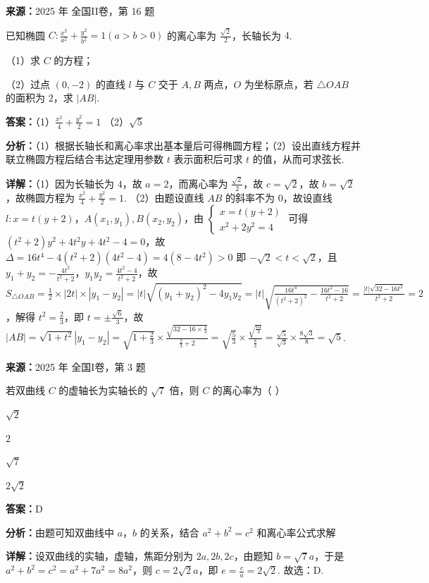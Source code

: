 \begin{question}[points=15]
\textbf{来源：}2025 年 全国II卷，第 16 题\par
已知椭圆 $C:\frac{x^2}{a^2}+\frac{y^2}{b^2}=1(a>b>0)$ 的离心率为 $\frac{\sqrt{2}}{2}$，长轴长为 $4$.

（1）求 $C$ 的方程；

（2）过点 $(0,-2)$ 的直线 $l$ 与 $C$ 交于 $A,B$ 两点，$O$ 为坐标原点，若 $\triangle OAB$ 的面积为 $2$，求 $|AB|$.
\begin{solution}
\textbf{答案：}（1）$\frac{x^2}{4}+\frac{y^2}{2}=1$
（2）$\sqrt{5}$

\textbf{分析：}（1）根据长轴长和离心率求出基本量后可得椭圆方程；（2）设出直线方程并联立椭圆方程后结合韦达定理用参数 $t$ 表示面积后可求 $t$ 的值，从而可求弦长.

\textbf{详解：}（1）因为长轴长为 $4$，故 $a=2$，而离心率为 $\frac{\sqrt{2}}{2}$，故 $c=\sqrt{2}$，故 $b=\sqrt{2}$，故椭圆方程为 $\frac{x^2}{4}+\frac{y^2}{2}=1$.
（2）由题设直线 $AB$ 的斜率不为 $0$，故设直线 $l:x=t(y+2)$，$A(x_1,y_1),B(x_2,y_2)$，由 $\begin{cases}x=t(y+2)\\x^2+2y^2=4\end{cases}$ 可得 $(t^2+2)y^2+4t^2y+4t^2-4=0$，故 $\Delta=16t^4-4(t^2+2)(4t^2-4)=4(8-4t^2)>0$ 即 $-\sqrt{2}<t<\sqrt{2}$，且 $y_1+y_2=-\frac{4t^2}{t^2+2}$，$y_1y_2=\frac{4t^2-4}{t^2+2}$，故 $S_{\triangle OAB}=\frac{1}{2}\times|2t|\times|y_1-y_2|=|t|\sqrt{(y_1+y_2)^2-4y_1y_2}=|t|\sqrt{\frac{16t^4}{(t^2+2)^2}-\frac{16t^2-16}{t^2+2}}=\frac{|t|\sqrt{32-16t^2}}{t^2+2}=2$，解得 $t^2=\frac{2}{3}$，即 $t=\pm\frac{\sqrt{6}}{3}$，故 $|AB|=\sqrt{1+t^2}|y_1-y_2|=\sqrt{1+\frac{2}{3}}\times\frac{\sqrt{32-16\times\frac{2}{3}}}{\frac{2}{3}+2}=\sqrt{\frac{5}{3}}\times\frac{\sqrt{\frac{64}{3}}}{\frac{8}{3}}=\frac{\sqrt{5}}{\sqrt{3}}\times\frac{8\sqrt{3}}{8}=\sqrt{5}$.
\end{solution}
\end{question}

\begin{question}[points=5]
\textbf{来源：}2025 年 全国I卷，第 3 题\par
若双曲线 $C$ 的虚轴长为实轴长的 $\sqrt{7}$ 倍，则 $C$ 的离心率为（ ）
\begin{choices}
  \item $\sqrt{2}$
  \item $2$
  \item $\sqrt{7}$
  \item $2\sqrt{2}$
\end{choices}
\begin{solution}
\textbf{答案：}D

\textbf{分析：}由题可知双曲线中 $a$，$b$ 的关系，结合 $a^2+b^2=c^2$ 和离心率公式求解

\textbf{详解：}设双曲线的实轴，虚轴，焦距分别为 $2a, 2b, 2c$，由题知 $b = \sqrt{7}a$，于是 $a^2 + b^2 = c^2 = a^2 + 7a^2 = 8a^2$，则 $c = 2\sqrt{2}a$，即 $e = \frac{c}{a} = 2\sqrt{2}$. 故选：D.
\end{solution}
\end{question}

